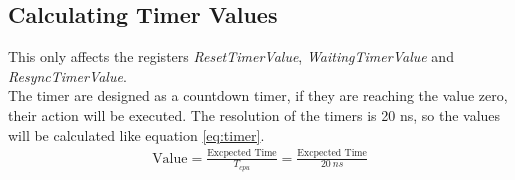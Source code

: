 \subsection{Calculating Timer Values}
\label{sec:CTV}
This only affects the registers \textit{ResetTimerValue}, \textit{WaitingTimerValue} and \textit{ResyncTimerValue}. \\ 
The timer are designed as a countdown timer, if they are reaching the value zero, their action will be executed. The resolution of the timers is 20 ns, so the values will be calculated like equation \ref{eq:timer}.
\begin{equation}
	\begin{split}
			\text{Value} = \frac{\text{Excpected Time}}{T_{cpu}} = \frac{\text{Excpected Time}}{20 ~ns} 
	\end{split}
\label{eq:timer}
\end{equation}	